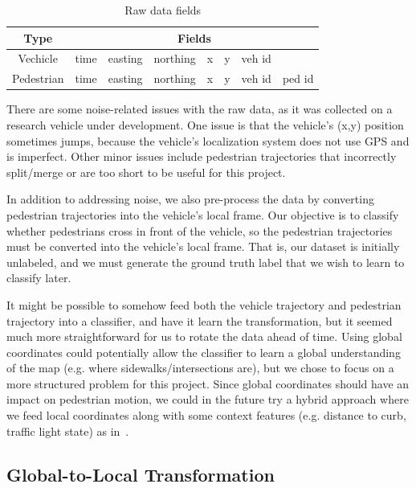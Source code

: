\begin{table}[ht!]
\centering
\begin{tabular}{||c||c c c c c c c||}  
 \hline
 \multirow{1}{*}{Type} &
       \multicolumn{7}{c||}{Fields} \\
 \hline\hline
 Vechicle & time & easting & northing & x & y & veh id & \\ \hline
 Pedestrian & time & easting & northing & x & y & veh id & ped id \\ \hline
\end{tabular}
\caption{Raw data fields}
\label{table_data}
\end{table}

There are some noise-related issues with the raw data, as it was collected on a research vehicle under development.
One issue is that the vehicle's (x,y) position sometimes jumps, because the vehicle's localization system does not use GPS and is imperfect.
Other minor issues include pedestrian trajectories that incorrectly split/merge or are too short to be useful for this project.

In addition to addressing noise, we also pre-process the data by converting pedestrian trajectories into the vehicle's local frame.
Our objective is to classify whether pedestrians cross in front of the vehicle, so the pedestrian trajectories must be converted into the vehicle's local frame.
That is, our dataset is initially unlabeled, and we must generate the ground truth label that we wish to learn to classify later.

It might be possible to somehow feed both the vehicle trajectory and pedestrian trajectory into a classifier, and have it learn the transformation, but it seemed much more straightforward for us to rotate the data ahead of time.
Using global coordinates could potentially allow the classifier to learn a global understanding of the map (e.g. where sidewalks/intersections are), but we chose to focus on a more structured problem for this project.
Since global coordinates should have an impact on pedestrian motion, we could in the future try a hybrid approach where we feed local coordinates along with some context features (e.g. distance to curb, traffic light state) as in~\cite{casnsc_NIPS}.

\subsection{Global-to-Local Transformation}

